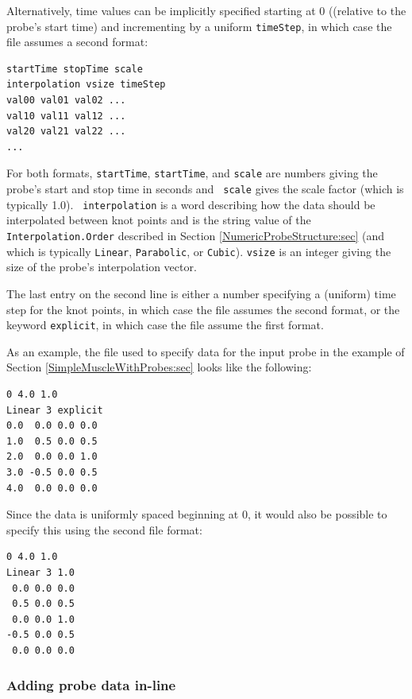 Alternatively, time values can be implicitly specified starting at 0
((relative to the probe's start time) and incrementing by a uniform
{\tt timeStep}, in which case the file assumes a second format:
%
\begin{lstlisting}
startTime stopTime scale
interpolation vsize timeStep
val00 val01 val02 ...
val10 val11 val12 ...
val20 val21 val22 ...
...
\end{lstlisting}
%
For both formats, {\tt startTime}, {\tt startTime}, and {\tt scale}
are numbers giving the probe's start and stop time in seconds and {\tt
scale} gives the scale factor (which is typically 1.0).  {\tt
interpolation} is a word describing how the data should be
interpolated between knot points and is the string value of the {\tt
Interpolation.Order} described in Section
\ref{NumericProbeStructure:sec} (and which is typically {\tt Linear},
{\tt Parabolic}, or {\tt Cubic}). {\tt vsize} is an integer giving the
size of the probe's interpolation vector.

The last entry on the second line is either a number specifying a
(uniform) time step for the knot points, in which case the file
assumes the second format, or the keyword {\tt explicit}, in which
case the file assume the first format.

As an example, the file used to specify data for the input probe in
the example of Section \ref{SimpleMuscleWithProbes:sec} looks like
the following:
%
\begin{lstlisting}
0 4.0 1.0
Linear 3 explicit
0.0  0.0 0.0 0.0 
1.0  0.5 0.0 0.5
2.0  0.0 0.0 1.0
3.0 -0.5 0.0 0.5
4.0  0.0 0.0 0.0
\end{lstlisting}
%
Since the data is uniformly spaced beginning at 0, it would also be
possible to specify this using the second file format:
%
\begin{lstlisting}
0 4.0 1.0
Linear 3 1.0
 0.0 0.0 0.0 
 0.5 0.0 0.5
 0.0 0.0 1.0
-0.5 0.0 0.5
 0.0 0.0 0.0
\end{lstlisting}
%

\subsubsection{Adding probe data in-line}

